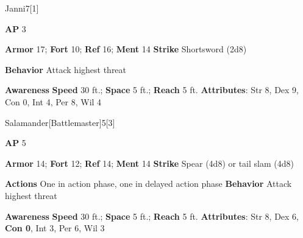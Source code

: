 \begin{monsection}{Janni}{7}[1]
\vspace{-1em}\vspace{-1em}
\begin{spellcontent}
\begin{spelltargetinginfo}
{\textbf{AP} 3}

\pari \textbf{Armor} 17;
\textbf{Fort} 10;
\textbf{Ref} 16;
\textbf{Ment} 14
\pari \textbf{Strike} Shortsword  (2d8)



\pari \textbf{Behavior} Attack highest threat
\end{spelltargetinginfo}
\end{spellcontent}

\begin{monsterfooter}
\pari \textbf{Awareness} 
\pari \textbf{Speed} 30 ft.;
\textbf{Space} 5 ft.;
\textbf{Reach} 5 ft.
\pari \textbf{Attributes}:
Str 8,
Dex 9,
Con 0,
Int 4,
Per 8,
Wil 4
\end{monsterfooter}
\end{monsection}

\begin{monsection}{Salamander}[Battlemaster]{5}[3]
\vspace{-1em}\vspace{-1em}
\begin{spellcontent}
\begin{spelltargetinginfo}
{\textbf{AP} 5}

\pari \textbf{Armor} 14;
\textbf{Fort} 12;
\textbf{Ref} 14;
\textbf{Ment} 14
\pari \textbf{Strike} Spear  (4d8) or tail slam  (4d8)


\pari \textbf{Actions} One in action phase, one in delayed action phase
\pari \textbf{Behavior} Attack highest threat
\end{spelltargetinginfo}
\end{spellcontent}

\begin{monsterfooter}
\pari \textbf{Awareness} 
\pari \textbf{Speed} 30 ft.;
\textbf{Space} 5 ft.;
\textbf{Reach} 5 ft.
\pari \textbf{Attributes}:
Str 8,
Dex 6,
\textbf{Con 0},
Int 3,
Per 6,
Wil 3
\end{monsterfooter}
\end{monsection}


